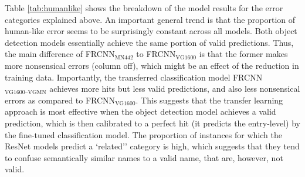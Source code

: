 Table \ref{tab:humanlike} shows the breakdown of the model results for the error categories explained above. An important general trend is that the proportion of human-like error seems to be surprisingly constant across all models. 
Both object detection models essentially achieve the same portion of valid predictions. Thus, the main difference of FRCNN$_{\text{MN442}}$ to  FRCNN$_{\text{VG1600}}$ is that the former makes more nonsensical errors (column off), which might be an effect of the reduction in training data.
Importantly, the transferred classification model FRCNN$_{\text{VG1600--VGMN}}$ achieves more hits but less valid predictions, and also less nonsensical errors as compared to FRCNN$_{\text{VG1600}}$.
This suggests that the transfer learning approach is most effective when the object detection model achieves a valid prediction, which is then calibrated to a perfect hit (it predicts the entry-level) by the fine-tuned classification model.
The proportion of instances for which the ResNet models predict a `related'' category is high, which suggests that they tend to confuse semantically similar names to a valid name, that are, however, not valid. 

